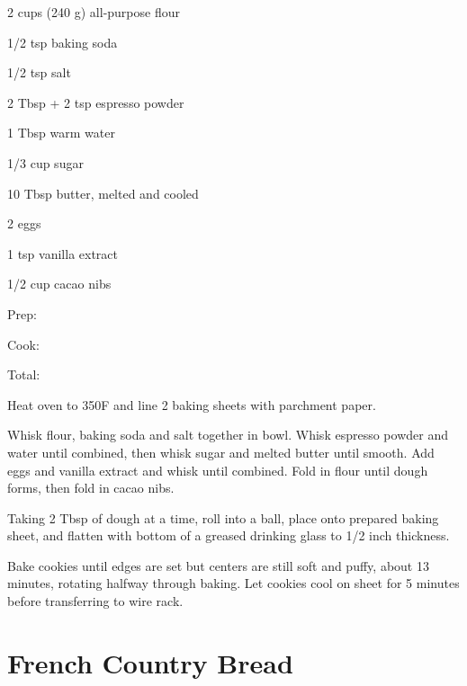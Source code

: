 \documentclass[oneside]{book}  %
\def\thisrecipe{}  %
\newcommand{\recipe}[1]{\section{#1}\def\thisrecipe{: #1}} %
\newcommand{\degF}{\textdegree F\xspace}
\begin{document}
\begin{IT}
  \begin{ingredients}
    \item[2 cups (240 g)] all-purpose flour
    \item[1/2 tsp] baking soda
    \item[1/2 tsp] salt
    \item[2 Tbsp + 2 tsp] espresso powder
    \item[1 Tbsp] warm water
    \item[1/3 cup] sugar
    \item[10 Tbsp] butter, melted and cooled
    \item[2] eggs
    \item[1 tsp] vanilla extract
    \item[1/2 cup] cacao nibs
  \end{ingredients}

  \switchcolumn

  \begin{timeline}
    \item[Prep:]  \todo
    \item[Cook:]  \todo
    \item[Total:] \todo
  \end{timeline}
\end{IT}

\begin{directions}
  \item Heat oven to 350\degF and line 2 baking sheets with parchment paper.

  \item Whisk flour, baking soda and salt together in bowl. Whisk espresso
    powder and water until combined, then whisk sugar and melted butter until
    smooth. Add eggs and vanilla extract and whisk until combined. Fold in flour
    until dough forms, then fold in cacao nibs.

  \item Taking 2 Tbsp of dough at a time, roll into a ball, place onto prepared
    baking sheet, and flatten with bottom of a greased drinking glass to 1/2
    inch thickness.

  \item Bake cookies until edges are set but centers are still soft and puffy,
    about 13 minutes, rotating halfway through baking. Let cookies cool on sheet
    for 5 minutes before transferring to wire rack.
\end{directions}
\recipe{French Country Bread} \label{recipe:french_country_bread} %
\end{document}

